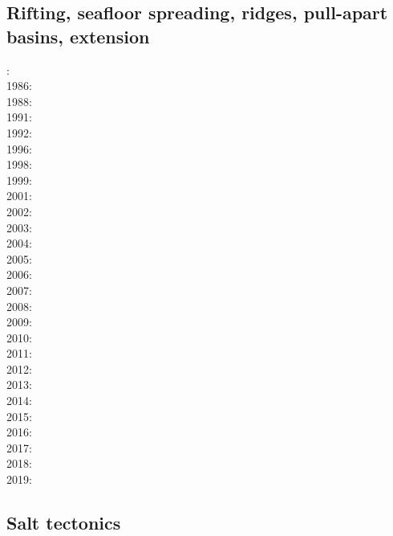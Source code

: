 \subsection*{Rifting, seafloor spreading, ridges, pull-apart basins, extension}

: \cite{bosw85}\\
1986: \cite{hoen86b}\cite{zupf86}\cite{zupa86}\cite{mofr86}\\
1988: \cite{bums88}\\
1991: \cite{trbr91}\cite{buck91}\\
1992: \cite{zieg92b}\\
1996: \cite{dusa96}\cite{beda96}\\
1998: \cite{rafm98}\\
1999: \cite{brun99}\cite{bulp99}\\
2001: \cite{hupc01}\cite{hupc01b}\cite{frbr01}\\
2002: \cite{hube02}\cite{hani02}\cite{dabm02}\\
2003: \cite{hube03}\cite{hani03}\cite{covb03}\\
2004: \cite{hier04}\\
2005: \cite{hubb05}\cite{coub05}\\
2006: \cite{tibs06}\cite{coma06}\\
2007: \cite{huha07}\cite{macl07}\\
2008: \cite{cort08}\\
2009: \cite{agcz09}\cite{kekj09}\\
2010: \cite{aubh10}\cite{gery10}\cite{fosr10}\\
2011: \cite{alht11}\cite{ellw11}\\
2012: \cite{alht12}\cite{brps12}\\
2013: \cite{alhf13}\cite{brau13}\cite{chbe13}\cite{knak13}\cite{kern13}\cite{mipf13}\cite{wabd13}\\
2014: \cite{hebr14}\cite{lige14}\cite{brun14}\cite{kobf14}\\
2015: \cite{nabu15}\\
2016: \cite{olbm16}\cite{jekm16}\cite{zwsn16}\\
2017: \cite{lemh17}\\
2018: \cite{chsm18}\\
2019: \cite{lisp19}\cite{zwsb19}\cite{anpa19}

\subsection*{Salt tectonics}

